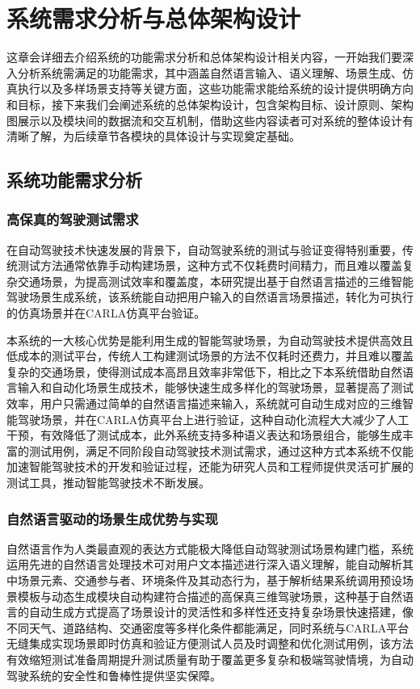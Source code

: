\chapter{系统需求分析与总体架构设计}
这章会详细去介绍系统的功能需求分析和总体架构设计相关内容，一开始我们要深入分析系统需满足的功能需求，其中涵盖自然语言输入、语义理解、场景生成、仿真执行以及多样场景支持等关键方面，这些功能需求能给系统的设计提供明确方向和目标，接下来我们会阐述系统的总体架构设计，包含架构目标、设计原则、架构图展示以及模块间的数据流和交互机制，借助这些内容读者可对系统的整体设计有清晰了解，为后续章节各模块的具体设计与实现奠定基础。
\section{系统功能需求分析}
\subsection{高保真的驾驶测试需求}
在自动驾驶技术快速发展的背景下，自动驾驶系统的测试与验证变得特别重要，传统测试方法通常依靠手动构建场景，这种方式不仅耗费时间精力，而且难以覆盖复杂交通场景，为提高测试效率和覆盖度，本研究提出基于自然语言描述的三维智能驾驶场景生成系统，该系统能自动把用户输入的自然语言场景描述，转化为可执行的仿真场景并在CARLA仿真平台验证。

本系统的一大核心优势是能利用生成的智能驾驶场景，为自动驾驶技术提供高效且低成本的测试平台，传统人工构建测试场景的方法不仅耗时还费力，并且难以覆盖复杂的交通场景，使得测试成本高昂且效率非常低下，相比之下本系统借助自然语言输入和自动化场景生成技术，能够快速生成多样化的驾驶场景，显著提高了测试效率，用户只需通过简单的自然语言描述来输入，系统就可自动生成对应的三维智能驾驶场景，并在CARLA仿真平台上进行验证，这种自动化流程大大减少了人工干预，有效降低了测试成本，此外系统支持多种语义表达和场景组合，能够生成丰富的测试用例，满足不同阶段自动驾驶技术测试需求，通过这种方式本系统不仅能加速智能驾驶技术的开发和验证过程，还能为研究人员和工程师提供灵活可扩展的测试工具，推动智能驾驶技术不断发展。
\subsection{自然语言驱动的场景生成优势与实现}

自然语言作为人类最直观的表达方式能极大降低自动驾驶测试场景构建门槛，系统运用先进的自然语言处理技术可对用户文本描述进行深入语义理解，能自动解析其中场景元素、交通参与者、环境条件及其动态行为，基于解析结果系统调用预设场景模板与动态生成模块自动构建符合描述的高保真三维驾驶场景，这种基于自然语言的自动生成方式提高了场景设计的灵活性和多样性还支持复杂场景快速搭建，像不同天气、道路结构、交通密度等多样化条件都能满足，同时系统与CARLA平台无缝集成实现场景即时仿真和验证方便测试人员及时调整和优化测试用例，该方法有效缩短测试准备周期提升测试质量有助于覆盖更多复杂和极端驾驶情境，为自动驾驶系统的安全性和鲁棒性提供坚实保障。

